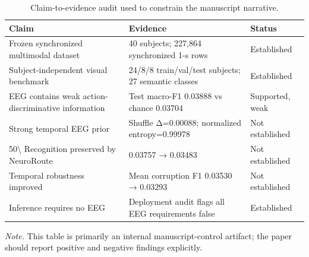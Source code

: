 \begin{table}[t]
\centering
\caption{Claim-to-evidence audit used to constrain the manuscript narrative.}
\label{tab:claim_audit}
\begin{tabular}{lll}
\toprule
Claim & Evidence & Status \\
\midrule
Frozen synchronized multimodal dataset & 40 subjects; 227,864 synchronized 1-s rows & Established \\
Subject-independent visual benchmark & 24/8/8 train/val/test subjects; 27 semantic classes & Established \\
EEG contains weak action-discriminative information & Test macro-F1 0.03888 vs chance 0.03704 & Supported, weak \\
Strong temporal EEG prior & Shuffle Δ=0.00088; normalized entropy=0.99978 & Not established \\
50\textbackslash{}%
Recognition preserved by NeuroRoute & 0.03757 → 0.03483 & Not established \\
Temporal robustness improved & Mean corruption F1 0.03530 → 0.03293 & Not established \\
Inference requires no EEG & Deployment audit flags all EEG requirements false & Established \\
\bottomrule
\end{tabular}
\par\smallskip\noindent\footnotesize\textit{Note.} This table is primarily an internal manuscript-control artifact; the paper should report positive and negative findings explicitly.
\end{table}
